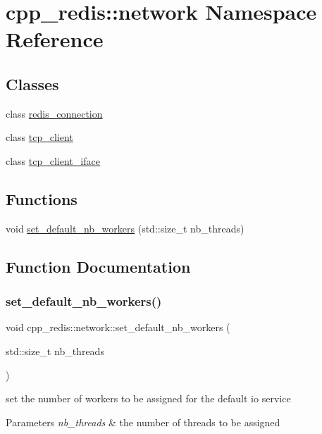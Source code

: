 \hypertarget{namespacecpp__redis_1_1network}{}\section{cpp\+\_\+redis\+:\+:network Namespace Reference}
\label{namespacecpp__redis_1_1network}
\subsection*{Classes}
\begin{DoxyCompactItemize}
\item 
class \hyperlink{classcpp__redis_1_1network_1_1redis__connection}{redis\+\_\+connection}
\item 
class \hyperlink{classcpp__redis_1_1network_1_1tcp__client}{tcp\+\_\+client}
\item 
class \hyperlink{classcpp__redis_1_1network_1_1tcp__client__iface}{tcp\+\_\+client\+\_\+iface}
\end{DoxyCompactItemize}
\subsection*{Functions}
\begin{DoxyCompactItemize}
\item 
void \hyperlink{namespacecpp__redis_1_1network_ad2aba0273ecb345152eb182c200f7844}{set\+\_\+default\+\_\+nb\+\_\+workers} (std\+::size\+\_\+t nb\+\_\+threads)
\end{DoxyCompactItemize}


\subsection{Function Documentation}
\mbox{\label{namespacecpp__redis_1_1network_ad2aba0273ecb345152eb182c200f7844}} 
\subsubsection{\texorpdfstring{set\+\_\+default\+\_\+nb\+\_\+workers()}{set\_default\_nb\_workers()}}
{\footnotesize\ttfamily void cpp\+\_\+redis\+::network\+::set\+\_\+default\+\_\+nb\+\_\+workers (\begin{DoxyParamCaption}\item[{std\+::size\+\_\+t}]{nb\+\_\+threads }\end{DoxyParamCaption})}

set the number of workers to be assigned for the default io service


\begin{DoxyParams}{Parameters}
{\em nb\+\_\+threads} & the number of threads to be assigned \\
\hline
\end{DoxyParams}
